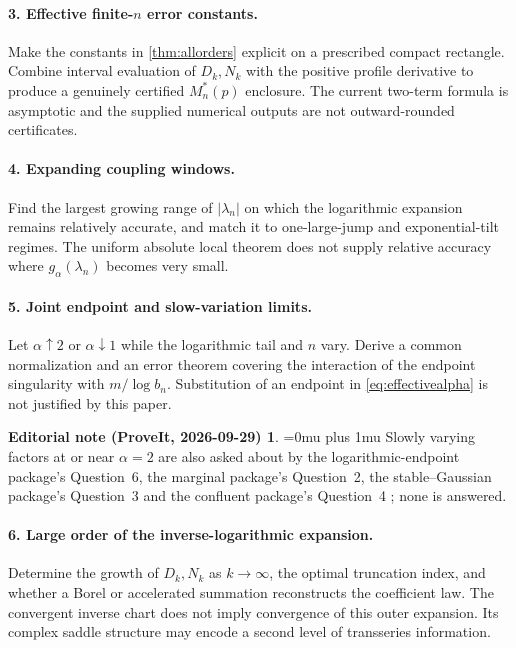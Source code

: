 \documentclass[11pt,a4paper]{article}
\numberwithin{equation}{section}
\theoremstyle{definition}\newtheorem{definition}[theorem]{Definition}
\theoremstyle{remark}\newtheorem{remark}[theorem]{Remark}
\theoremstyle{definition}
\newtheorem*{ednoteinner}{Editorial note (ProveIt, 2026-09-29)}
\newenvironment{ednote}{\begin{ednoteinner}\sloppy\Urlmuskip=0mu plus 1mu\relax}{\end{ednoteinner}}
\begin{document}
\paragraph{3. Effective finite-$n$ error constants.}
Make the constants in \cref{thm:allorders} explicit on a prescribed compact
rectangle. Combine interval evaluation of $D_k,N_k$ with the positive
profile derivative to produce a genuinely certified $M_n^*(p)$ enclosure.
The current two-term formula is asymptotic and the supplied numerical
outputs are not outward-rounded certificates.

\paragraph{4. Expanding coupling windows.}
Find the largest growing range of $|\lambda_n|$ on which the logarithmic
expansion remains relatively accurate, and match it to one-large-jump and
exponential-tilt regimes. The uniform absolute local theorem does not
supply relative accuracy where $g_\alpha(\lambda_n)$ becomes very small.

\paragraph{5. Joint endpoint and slow-variation limits.}
Let $\alpha\uparrow2$ or $\alpha\downarrow1$ while the logarithmic tail and
$n$ vary. Derive a common normalization and an error theorem covering the
interaction of the endpoint singularity with $m/\log b_n$. Substitution
of an endpoint in \eqref{eq:effectivealpha} is not justified by this paper.
\begin{ednote}
Slowly varying factors at or near $\alpha=2$ are also asked about by the
logarithmic-endpoint package's Question~6, the marginal package's
Question~2, the stable--Gaussian package's Question~3 and the confluent
package's Question~4 \cite{ed:lce,ed:mct,ed:sge,ed:cct}; none is answered.
\end{ednote}

\paragraph{6. Large order of the inverse-logarithmic expansion.}
Determine the growth of $D_k,N_k$ as $k\to\infty$, the optimal truncation
index, and whether a Borel or accelerated summation reconstructs the
coefficient law. The convergent inverse chart does not imply convergence
of this outer expansion. Its complex saddle structure may encode a second
level of transseries information.
\end{document}
